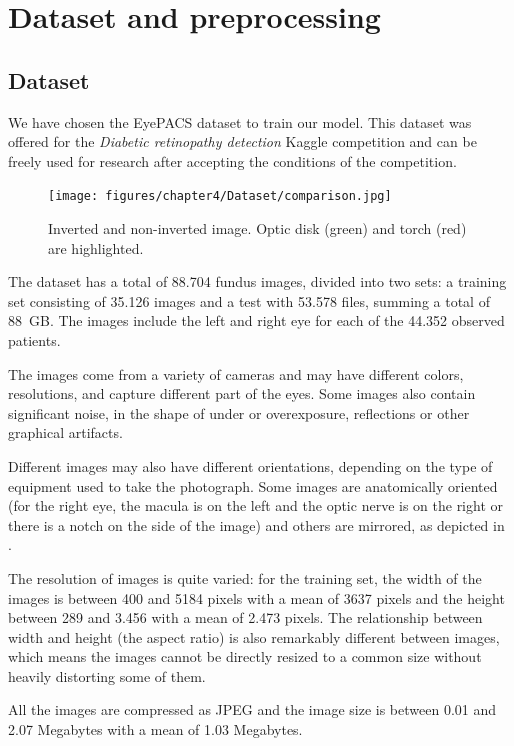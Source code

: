 \chapter{Dataset and preprocessing}\label{chapter4}
\section{Dataset}
We have chosen the EyePACS dataset \cite{cuadros2009eyepacs} to train our model. This dataset was offered for the \textit{Diabetic retinopathy detection} Kaggle competition \cite{diabeticretinopathydetection}  and can be freely used for research after accepting the conditions of the competition.

\begin{figure}[tbp]
    \centering
    \texttt{[image: figures/chapter4/Dataset/comparison.jpg]}
    \caption{Inverted and non-inverted image. Optic disk (green) and torch (red) are highlighted.}
    \label{fig:inverted}
\end{figure}

The dataset has a total of 88.704 fundus images, divided into two sets: a training set consisting of 35.126 images and a test with 53.578 files, summing a total of 88 GB. The images include the left and right eye for each of the 44.352 observed patients. 

The images come from a variety of cameras and may have different colors, resolutions, and capture different part of the eyes. Some images also contain significant noise, in the shape of under or overexposure, reflections or other graphical artifacts.

Different images may also have different orientations, depending on the type of equipment used to take the photograph. Some images are anatomically oriented (for the right eye, the macula is on the left and the optic nerve is on the right or there is a notch on the side of the image) and others are mirrored, as depicted in .

The resolution of images is quite varied: for the training set, the width of the images is between 400 and 5184 pixels with a mean of 3637 pixels and the height between 289 and 3.456 with a mean of 2.473 pixels. The relationship between width and height (the aspect ratio) is also remarkably different between images, which means the images cannot be directly resized to a common size without heavily distorting some of them.

All the images are compressed as JPEG and the image size is between 0.01 and 2.07 Megabytes with a mean of 1.03 Megabytes.

